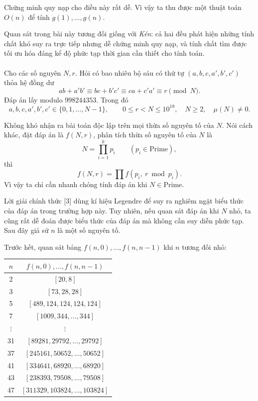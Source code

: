 \documentclass[11pt]{article}
\begin{document}
Chứng minh quy nạp cho điều này rất dễ. Vì vậy ta thu được một thuật toán
\(O(n)\) để tính \(g(1),\ldots,g(n)\).

Quan sát trong bài này tương đối giống với \emph{Kén}: cả hai đều phát hiện
những tính chất khó suy ra trực tiếp nhưng dễ chứng minh quy nạp, và tính
chất tìm được tối ưu hóa đáng kể độ phức tạp thời gian cần thiết cho tính
toán.

\paragraph{}
Cho các số nguyên \(N,r\). Hỏi có bao nhiêu bộ sáu có thứ tự
\((a,b,c,a',b',c')\) thỏa hệ đồng dư
\[
  ab+a'b'\equiv bc+b'c'\equiv ca+c'a'\equiv r\pmod N.
\]
Đáp án lấy modulo \(998244353\). Trong đó
\[
  a,b,c,a',b',c'\in\{0,1,\ldots,N-1\},\qquad
  0\le r<N\le 10^{18},\quad N\ge 2,\quad \mu(N)\ne 0.
\]

Không khó nhận ra bài toán độc lập trên mọi thừa số nguyên tố của \(N\). Nói
cách khác, đặt đáp án là \(f(N,r)\), phân tích thừa số nguyên tố của \(N\) là
\[
  N=\prod_{i=1}^{k}p_i\qquad (p_i\in\mathrm{Prime}),
\]
thì
\[
  f(N,r)=\prod f(p_i,\ r\bmod p_i).
\]
Vì vậy ta chỉ cần nhanh chóng tính đáp án khi \(N\in\mathrm{Prime}\).

Lời giải chính thức [3] dùng kí hiệu Legendre để suy ra nghiêm ngặt biểu thức
của đáp án trong trường hợp này. Tuy nhiên, nếu quan sát đáp án khi \(N\) nhỏ,
ta cũng rất dễ đoán được biểu thức của đáp án mà không cần suy diễn phức tạp.
Sau đây giả sử \(n\) là một số nguyên tố.

Trước hết, quan sát bảng \(f(n,0),\ldots,f(n,n-1)\) khi \(n\) tương đối nhỏ:

\begin{center}
\small
\begin{tabular}{c c}
\(n\) & \(f(n,0),\ldots,f(n,n-1)\) \\
\hline
2 & \([20,8]\) \\
3 & \([73,28,28]\) \\
5 & \([489,124,124,124,124]\) \\
7 & \([1009,344,\ldots,344]\) \\
\(\vdots\) & \(\vdots\) \\
31 & \([89281,29792,\ldots,29792]\) \\
37 & \([245161,50652,\ldots,50652]\) \\
41 & \([334641,68920,\ldots,68920]\) \\
43 & \([238393,79508,\ldots,79508]\) \\
47 & \([311329,103824,\ldots,103824]\)
\end{tabular}
\end{center}
\end{document}
